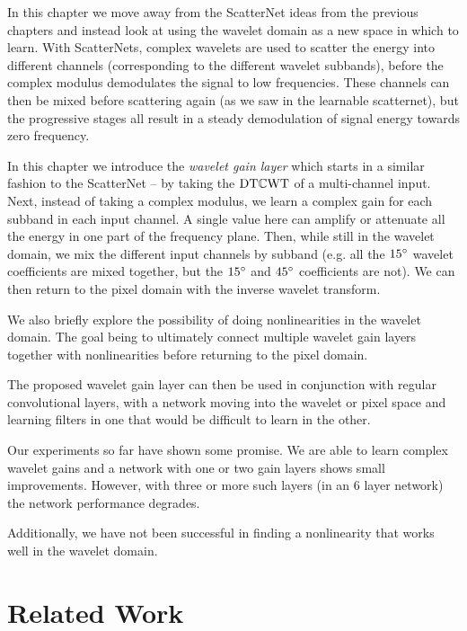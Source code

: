 In this chapter we move away from the ScatterNet ideas from the previous 
chapters and instead look at using the wavelet domain as a new space in which to
learn. With ScatterNets, complex wavelets are used to scatter the energy into
different channels (corresponding to the different wavelet subbands), before the
complex modulus demodulates the signal to low frequencies. These channels can
then be mixed before scattering again (as we saw in the learnable scatternet),
but the progressive stages all result in a steady demodulation of signal energy
towards zero frequency. 

In this chapter we introduce the \emph{wavelet gain layer}
which starts in a similar fashion to the ScatterNet -- by taking the $\mathrm{DT}\mathbb{C}\mathrm{WT}$ of
a multi-channel input. Next, instead of taking a complex modulus, we learn a 
complex gain for each subband in each input channel. A single value here can 
amplify or attenuate all the energy in one part of the frequency plane. Then, 
while still in the wavelet domain, we mix the different input channels by subband (e.g.
all the $15^{\circ}$ wavelet coefficients are mixed together, but the $15^{\circ}$ and
$45^{\circ}$ coefficients are not). We can then return to the pixel
domain with the inverse wavelet transform. 

We also briefly explore the possibility of doing nonlinearities in the wavelet
domain. The goal being to ultimately connect multiple wavelet gain layers
together with nonlinearities before returning to the pixel domain. 

The proposed wavelet gain layer can then be used in conjunction with regular
convolutional layers, with a network moving into the wavelet or pixel space and
learning filters in one that would be difficult to learn in the other.

Our experiments so far have shown some promise. We are able to learn complex
wavelet gains and a network with one or two gain layers shows small improvements.
However, with three or more such layers (in an 6 layer network) the network performance 
degrades. 

Additionally, we have not been successful in finding a nonlinearity that works
well in the wavelet domain. 

\section{Related Work}\label{sec:ch6:related} 
